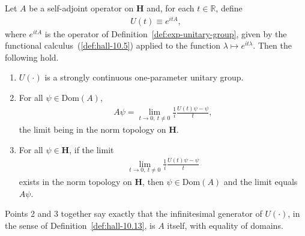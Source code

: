 \begin{proposition}
    \label{prpstn:hall-10.14}
    \leanok
    Let $A$ be a self-adjoint operator on $\mathbf{H}$ and, for each $t \in \mathbb{R}$, define
    \begin{align}
        U(t) \equiv e^{itA},
    \end{align}
    where $e^{itA}$ is the operator of Definition~\ref{def:exp-unitary-group}, given by the functional calculus~(\ref{def:hall-10.5}) applied to the function $\lambda \mapsto e^{it\lambda}$. Then the following hold.
    \begin{enumerate}
        \item $U(\cdot)$ is a strongly continuous one-parameter unitary group.
        \item For all $\psi \in \text{Dom}(A)$,
        \begin{align}
            A\psi = \lim\limits_{t \rightarrow 0,\ t \ne 0} \frac{1}{i} \frac{U(t)\psi - \psi}{t},
        \end{align}
        the limit being in the norm topology on $\mathbf{H}$.
        \item For all $\psi \in \mathbf{H}$, if the limit
        \begin{align}
            \lim\limits_{t \rightarrow 0,\ t \ne 0} \frac{1}{i} \frac{U(t)\psi - \psi}{t}
        \end{align}
        exists in the norm topology on $\mathbf{H}$, then $\psi \in \text{Dom}(A)$ and the limit equals $A\psi$.
    \end{enumerate}
    Points 2 and 3 together say exactly that the infinitesimal generator of $U(\cdot)$, in the sense of Definition~\ref{def:hall-10.13}, is $A$ itself, with equality of domains.
\end{proposition}
